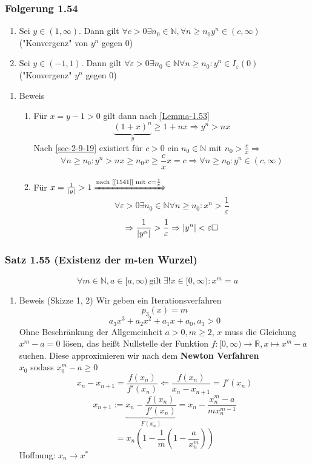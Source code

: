 \documentclass[11pt]{article}
\DeclarePairedDelimiter\abs{\lvert}{\rvert}%
\DeclareMathOperator{\Forall}{\forall}%
\begin{document}
\subsubsection{Folgerung 1.54}
\label{sec-2-9-21}
\begin{enumerate}
\item Sei $y\in(1,\infty)$. Dann gilt $\Forall c > 0 \exists n_0 \in \mathbb{N},\Forall n\geq n_0 y^n \in (c,\infty)$ ("Konvergenz" von $y^n$ gegen 0)
\item Sei $y \in (-1,1)$. Dann gilt $\Forall \varepsilon > 0\exists n_0 \in \mathbb{N}\Forall n\geq n_0:y^n \in I_\varepsilon (0)$ ("Konvergenz" $y^n$ gegen 0)
\end{enumerate}
\begin{enumerate}
\item Beweis
\label{sec-2-9-21-1}
\begin{enumerate}
\item \label{1541} Für $x = y - 1 > 0$ gilt dann nach \ref{Lemma-1.53} \[\underbrace{(1 + x)^n}_y \geq 1 + n x \Rightarrow y^n > n x\]
        Nach \ref{sec-2-9-19} existiert für $c > 0$ ein $n_0 \in \mathbb{N}$ mit $n_0 > \frac{c}{x} \Rightarrow$
        \[\Forall n\geq n_0: y^n > n x \geq n_0 x \geq \frac{c}{x} x = c \Rightarrow \Forall n\geq n_0: y^n\in(c,\infty)\]
\item Für  $x = \frac{1}{\abs{y}} > 1 \xRightarrow{\text{nach [[1541]] mit } c = \frac{1}{\varepsilon}}$
        \[\Forall \varepsilon > 0\exists n_0\in\mathbb{N}\Forall n\geq n_0: x^n > \frac{1}{\varepsilon}\]
        \[\Rightarrow \frac{1}{\abs{y^n}} > \frac{1}{\varepsilon} \Rightarrow \abs{y^n} < \varepsilon \hfill \square\]
\end{enumerate}
\end{enumerate}
\subsubsection{Satz 1.55 (Existenz der m-ten Wurzel)}
\label{sec-2-9-22}
\[\Forall m\in\mathbb{N}, a\in[a,\infty)~\text{gilt}~\exists ! x\in [0,\infty): x^m = a\]
\begin{enumerate}
\item Beweis (Skizze 1, 2)
\label{sec-2-9-22-1}
Wir geben ein Iterationsverfahren
\[p_3 (x) = m\]
\[a_3 x^3 + a_2 x^2 + a_1 x + a_0, a_3 > 0\]
Ohne Beschränkung der Allgemeinheit $a > 0,m\geq 2$, $x$ muss die Gleichung $x^m -a = 0$ lösen, das heißt Nullstelle der Funktion $f:[0,\infty) \to \mathbb{R},x\mapsto x^m - a$ suchen.
Diese approximieren wir nach dem \textbf{Newton Verfahren} \\
     $x_0$ sodass $x_0^m - a \geq 0$
\[x_n - x_{n + 1} = \frac{f(x_n)}{f'(x_n)} \Leftarrow \frac{f(x_n)}{x_n - x_{n + 1}} = f'(x_n)\]
\[x_{n+1} := \underbrace{x_n - \frac{f(x_n)}{f'(x_n)}}_{F(x_n)} = x_n - \frac{x_n^m - a}{m x_n^{m - 1}}\]
\[= x_n(1 - \frac{1}{m}(1 - \frac{a}{x_n^m}))\]
Hoffnung: $x_n \to x^*$
\end{enumerate}
\end{document}
